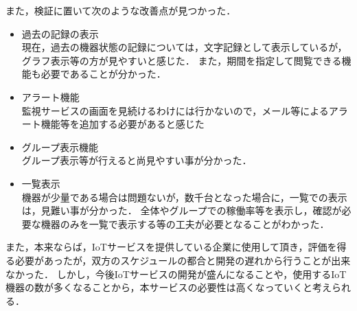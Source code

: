 また，検証に置いて次のような改善点が見つかった．
\begin{itemize}
\item 過去の記録の表示\\
	現在，過去の機器状態の記録については，文字記録として表示しているが，グラフ表示等の方が見やすいと感じた．
	また，期間を指定して閲覧できる機能も必要であることが分かった．
\item アラート機能\\
	監視サービスの画面を見続けるわけには行かないので，メール等によるアラート機能等を追加する必要があると感じた
\item グループ表示機能\\
	グループ表示等が行えると尚見やすい事が分かった．
\item 一覧表示\\
	機器が少量である場合は問題ないが，数千台となった場合に，一覧での表示は，見難い事が分かった．
	全体やグループでの稼働率等を表示し，確認が必要な機器のみを一覧で表示する等の工夫が必要となることがわかった．
\end{itemize}
また，本来ならば，IoTサービスを提供している企業に使用して頂き，評価を得る必要があったが，双方のスケジュールの都合と開発の遅れから行うことが出来なかった．
しかし，今後IoTサービスの開発が盛んになることや，使用するIoT機器の数が多くなることから，本サービスの必要性は高くなっていくと考えられる．

